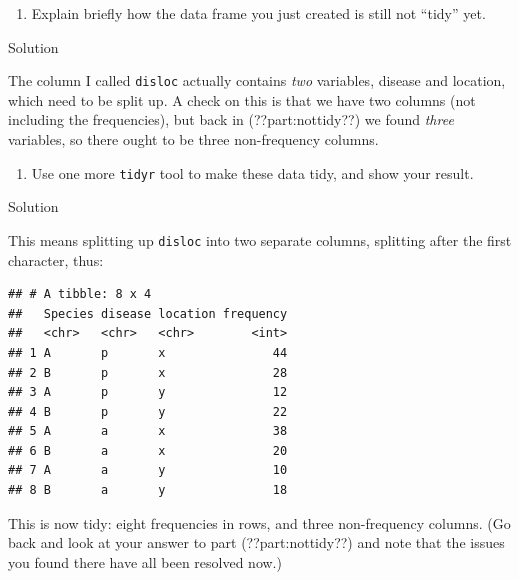 \documentclass[]{tufte-book}
\newenvironment{Shaded}{}{}
\newcommand{\DecValTok}[1]{\textcolor[rgb]{0.25,0.63,0.44}{#1}}
\newcommand{\FloatTok}[1]{\textcolor[rgb]{0.25,0.63,0.44}{#1}}
\newcommand{\KeywordTok}[1]{\textcolor[rgb]{0.00,0.44,0.13}{\textbf{#1}}}
\newcommand{\NormalTok}[1]{#1}
\newcommand{\OperatorTok}[1]{\textcolor[rgb]{0.40,0.40,0.40}{#1}}
\newcommand{\StringTok}[1]{\textcolor[rgb]{0.25,0.44,0.63}{#1}}
\providecommand{\tightlist}{%
  \setlength{\itemsep}{0pt}\setlength{\parskip}{0pt}}
\theoremstyle{definition}
\theoremstyle{definition}
\theoremstyle{definition}
\theoremstyle{remark}
\begin{document}
\begin{enumerate}
\def\labelenumi{(\alph{enumi})}
\setcounter{enumi}{3}
\tightlist
\item
  Explain briefly how the data frame you just created is still not
  ``tidy'' yet.
\end{enumerate}

Solution

The column I called \texttt{disloc} actually contains \emph{two}
variables, disease and location, which need to be split up. A check on
this is that we have two columns (not including the frequencies), but
back in (??part:nottidy??) we found \emph{three} variables, so there
ought to be three non-frequency columns.

\begin{enumerate}
\def\labelenumi{(\alph{enumi})}
\setcounter{enumi}{4}
\tightlist
\item
  Use one more \texttt{tidyr} tool to make these data tidy, and show
  your result.
\end{enumerate}

Solution

This means splitting up \texttt{disloc} into two separate columns,
splitting after the first character, thus:

\begin{Shaded}
\end{Shaded}

\begin{verbatim}
## # A tibble: 8 x 4
##   Species disease location frequency
##   <chr>   <chr>   <chr>        <int>
## 1 A       p       x               44
## 2 B       p       x               28
## 3 A       p       y               12
## 4 B       p       y               22
## 5 A       a       x               38
## 6 B       a       x               20
## 7 A       a       y               10
## 8 B       a       y               18
\end{verbatim}

This is now tidy: eight frequencies in rows, and three non-frequency
columns. (Go back and look at your answer to part (??part:nottidy??) and
note that the issues you found there have all been resolved now.)
\end{document}
